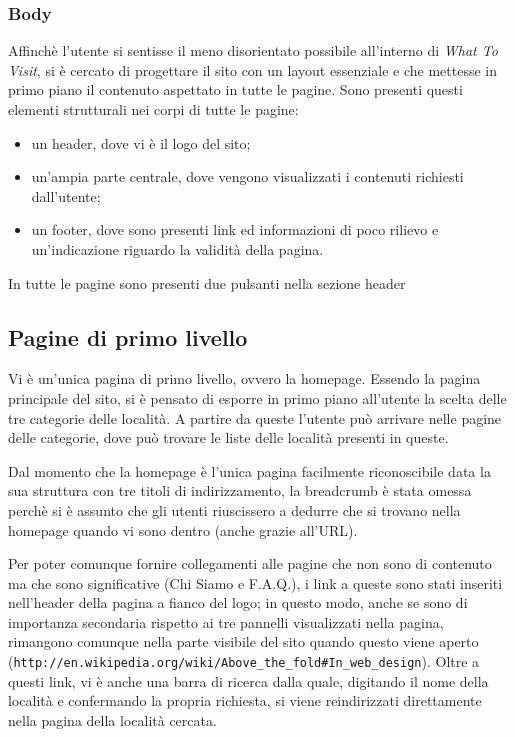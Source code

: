 \subsubsection{Body}
Affinchè l'utente si sentisse il meno disorientato possibile all'interno di \textit{What To Visit}, si è cercato di progettare il sito con un layout essenziale e che mettesse in primo piano il contenuto aspettato in tutte le pagine.
Sono presenti questi elementi strutturali nei corpi di tutte le pagine:
\begin{itemize}
\item un header, dove vi è il logo del sito;
\item un'ampia parte centrale, dove vengono visualizzati i contenuti richiesti dall'utente;
\item un footer, dove sono presenti link ed informazioni di poco rilievo e un'indicazione riguardo la validità della pagina.
\end{itemize}

In tutte le pagine sono presenti due pulsanti nella sezione header

\subsection{Pagine di primo livello}
Vi è un'unica pagina di primo livello, ovvero la homepage.
Essendo la pagina principale del sito, si è pensato di esporre in primo piano all'utente la scelta delle tre categorie delle località.
A partire da queste l'utente può arrivare nelle pagine delle categorie, dove può trovare le liste delle località presenti in queste.

Dal momento che la homepage è l'unica pagina facilmente riconoscibile data la sua struttura con tre titoli di indirizzamento, la breadcrumb è stata omessa perchè si è assunto che gli utenti riuscissero a dedurre che si trovano nella homepage quando vi sono dentro (anche grazie all'URL).

Per poter comunque fornire collegamenti alle pagine che non sono di contenuto ma che sono significative (Chi Siamo e F.A.Q.), i link a queste sono stati inseriti nell'header della pagina a fianco del logo; in questo modo, anche se sono di importanza secondaria rispetto ai tre pannelli visualizzati nella pagina, rimangono comunque nella parte visibile del sito quando questo viene aperto (\texttt{http://en.wikipedia.org/wiki/Above\_the\_fold\#In\_web\_design}). Oltre a questi link, vi è anche una barra di ricerca dalla quale, digitando il nome della località e confermando la propria richiesta, si viene reindirizzati direttamente nella pagina della località cercata.

